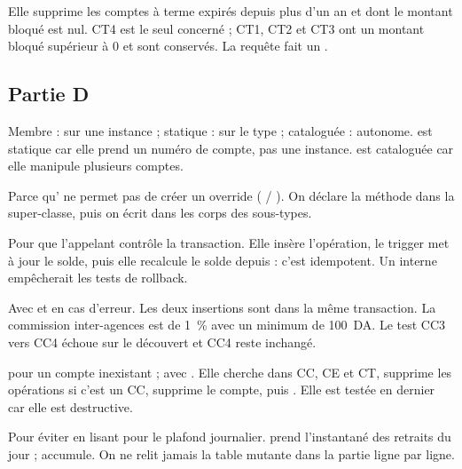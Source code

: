 {Elle supprime les comptes à terme expirés depuis plus d'un an et dont le
montant bloqué est nul.}
{CT4 est le seul concerné ; CT1, CT2 et CT3 ont un montant bloqué supérieur à
0 et sont conservés. La requête fait un .}

\subsection{Partie D}

{Membre : sur une instance ; statique : sur le type ; cataloguée : autonome.}
{ est statique car elle prend un numéro de compte, pas une
instance.  est cataloguée car elle manipule plusieurs comptes.}

{Parce qu' ne permet pas de créer un override
( / ).}
{On déclare la méthode dans la super-classe, puis on écrit
 dans les corps des sous-types.}

{Pour que l'appelant contrôle la transaction.}
{Elle insère l'opération, le trigger  met à jour le solde, puis
elle recalcule le solde depuis  : c'est idempotent. Un
 interne empêcherait les tests de rollback.}

{Avec  et  en cas d'erreur.}
{Les deux insertions sont dans la même transaction. La commission
inter-agences est de 1~\% avec un minimum de 100~DA. Le test CC3 vers CC4
échoue sur le découvert et CC4 reste inchangé.}

{ pour un compte inexistant ;  avec
.}
{Elle cherche dans CC, CE et CT, supprime les opérations si c'est un CC,
supprime le compte, puis . Elle est testée en dernier car elle
est destructive.}

{Pour éviter  en lisant  pour le plafond
journalier.}
{ prend l'instantané des retraits du jour ;
 accumule. On ne relit jamais la table mutante dans la
partie ligne par ligne.}

